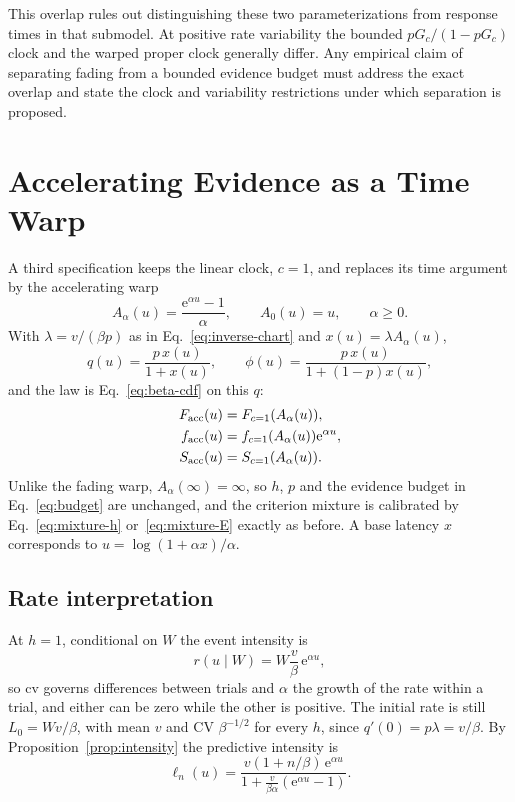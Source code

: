 \documentclass[12pt]{article}
\newcommand{\e}{\mathrm{e}}
\theoremstyle{definition}
\theoremstyle{plain}
\theoremstyle{remark}
\begin{document}
This overlap rules out distinguishing these two parameterizations from response times in that submodel. At positive rate variability the bounded $pG_c/(1-pG_c)$ clock and the warped proper clock generally differ. Any empirical claim of separating fading from a bounded evidence budget must address the exact overlap and state the clock and variability restrictions under which separation is proposed.

\section{Accelerating Evidence as a Time Warp}\label{sec:accel}

A third specification keeps the linear clock, $c=1$, and replaces its time argument by the accelerating warp
\begin{equation}
 A_\alpha(u)=\frac{\e^{\alpha u}-1}{\alpha},\qquad
 A_0(u)=u,\qquad \alpha\geq0.\label{eq:accel-clock}
\end{equation}
With $\lambda=v/(\beta p)$ as in Eq.~\eqref{eq:inverse-chart} and $x(u)=\lambda A_\alpha(u)$,
\begin{equation}
 q(u)=\frac{p\,x(u)}{1+x(u)},\qquad
 \phi(u)=\frac{p\,x(u)}{1+(1-p)x(u)},\label{eq:accel-q}
\end{equation}
and the law is Eq.~\eqref{eq:beta-cdf} on this $q$:
\begin{align}
 F_{\rm acc}(u)&=F_{c=1}(A_\alpha(u)),\\
 f_{\rm acc}(u)&=f_{c=1}(A_\alpha(u))\e^{\alpha u},\\
 S_{\rm acc}(u)&=S_{c=1}(A_\alpha(u)).\label{eq:accel-law}
\end{align}
Unlike the fading warp, $A_\alpha(\infty)=\infty$, so $h$, $p$ and the evidence budget in Eq.~\eqref{eq:budget} are unchanged, and the criterion mixture is calibrated by Eq.~\eqref{eq:mixture-h} or~\eqref{eq:mixture-E} exactly as before. A base latency $x$ corresponds to $u=\log(1+\alpha x)/\alpha$.

\subsection{Rate interpretation}
At $h=1$, conditional on $W$ the event intensity is
\begin{equation}
 r(u\mid W)=W\frac v\beta\,\e^{\alpha u},\label{eq:accel-rate}
\end{equation}
so $\mathrm{cv}$ governs differences between trials and $\alpha$ the growth of the rate within a trial, and either can be zero while the other is positive. The initial rate is still $L_0=W v/\beta$, with mean $v$ and CV $\beta^{-1/2}$ for every $h$, since $q'(0)=p\lambda=v/\beta$. By Proposition~\ref{prop:intensity} the predictive intensity is
\begin{equation}
 \ell_n(u)=\frac{v(1+n/\beta)\,\e^{\alpha u}}{1+\frac v{\beta\alpha}(\e^{\alpha u}-1)}.\label{eq:accel-intensity}
\end{equation}
\end{document}
